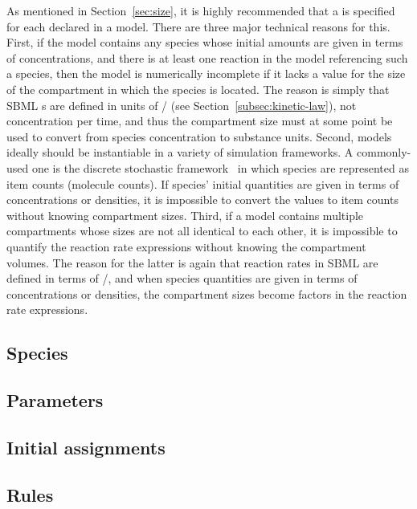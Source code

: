 As mentioned in Section~\ref{sec:size}, it is highly recommended
that a  is specified for each 
declared in a model. There are three major technical reasons for
this.  First, if the model contains any species whose initial
amounts are given in terms of concentrations, and there is at
least one reaction in the model referencing such a species, then
the model is numerically incomplete if it lacks a value for the
size of the compartment in which the species is located.  The
reason is simply that SBML
\Reaction{}s are defined in units of
/ (see
Section~\ref{subsec:kinetic-law}), not concentration per time, and
thus the compartment size must at some point be used to convert
from species concentration to substance units.  Second, models
ideally should be instantiable in a variety of simulation
frameworks.  A commonly-used one is the discrete stochastic
framework~\citep{gillespie:1977,wilkinson_2006} in which species
are represented as item counts (\eg molecule counts).  If species'
initial quantities are given in terms of concentrations or
densities, it is impossible to convert the values to item counts
without knowing compartment sizes.  Third,
if a model contains multiple compartments whose sizes are not all
identical to each other, it is impossible to quantify the reaction
rate expressions without knowing the compartment volumes.  The
reason for the latter is again that reaction rates in SBML are defined
in terms of /, and when species quantities are
given in terms of concentrations or densities, the compartment
sizes become factors in the reaction rate expressions.



\subsection{Species}
\label{sec:bp:species}


\subsection{Parameters}
\label{sec:bp:parameters}


\subsection{Initial assignments}
\label{sec:bp:init-assign}


\subsection{Rules}
\label{sec:bp:rules}

